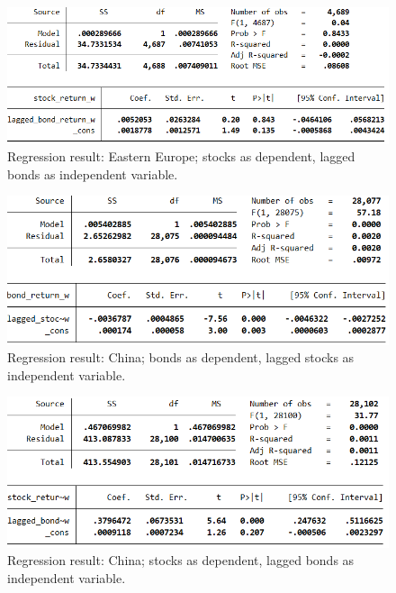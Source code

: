 \begin{figure}[H]
	\centering
	\includegraphics[width=1.0\linewidth]{figures/regression-results/regression-eue-stocks-as-dependent.PNG}
	\caption{Regression result: Eastern Europe; stocks as dependent, lagged bonds as independent variable. }
	\label{fig:regression-eue-stocks-as-dependent}
\end{figure}

\begin{figure}[H]
	\centering
	\includegraphics[width=1.0\linewidth]{figures/regression-results/regression-china-bonds-as-dependent.PNG}
	\caption{Regression result: China; bonds as dependent, lagged stocks as independent variable. }
	\label{fig:regression-china-bonds-as-dependent}
\end{figure}

\begin{figure}[H]
	\centering
	\includegraphics[width=1.0\linewidth]{figures/regression-results/regression-china-stocks-as-dependent.PNG}
	\caption{Regression result: China; stocks as dependent, lagged bonds as independent variable. }
	\label{fig:regression-china-stocks-as-dependent}
\end{figure}

